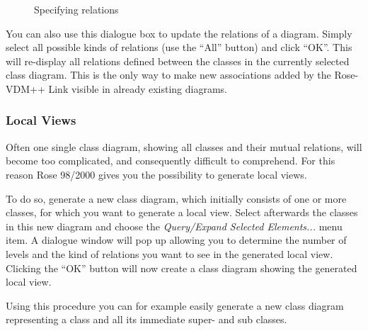 \documentclass[\pformat,12pt]{article}
\newcommand{\vdmpp}{VDM++}
\newcommand{\link}{Rose-\vdmpp{} Link}
\newcommand{\rose}{Rose 98/2000}
\begin{document}
\begin{figure}[htb]
\begin{center}
\mbox{}
\caption{Specifying relations\label{fig:relations}}
\end{center}
\end{figure}

You can also use this dialogue box to update the relations of a
diagram. Simply select all possible kinds of relations (use the
``All'' button) and click ``OK''. This will re-display all relations
defined between the classes in the currently selected class diagram.
This is the only way to make new associations added by the \link{}
  visible in already existing diagrams.

\subsubsection*{Local Views}
Often one single class diagram, showing all classes and their mutual relations, will become too   
complicated, and consequently difficult to comprehend. For this reason  
\rose{} gives you the possibility to generate local views.

To do so, generate a new class diagram, which initially consists of one
or more classes, for which you want to generate a local view.  Select afterwards the
classes in this new diagram and choose the {\it Query/Expand Selected
  Elements...} menu item. A dialogue window will pop up allowing you
to determine the number of levels and the kind of relations you want
to see in the generated local view.
Clicking the ``OK'' button will now create a class diagram showing the generated local view.

Using this procedure you can for example easily generate a new class diagram
representing a class and all its immediate super- and sub classes.
\end{document}
